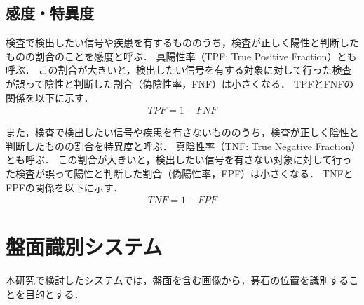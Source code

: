 \documentclass[openright]{nitocs}
\numberwithin{equation}{section}
\begin{document}
        \subsection{感度・特異度} %
        検査で検出したい信号や疾患を有するもののうち，検査が正しく陽性と判断したものの割合のことを感度と呼ぶ．
        真陽性率（TPF: True Positive Fraction）とも呼ぶ．
        この割合が大きいと，検出したい信号を有する対象に対して行った検査が誤って陰性と判断した割合（偽陰性率，FNF）は小さくなる．
        TPFとFNFの関係を以下に示す．
        \begin{align}
            TPF = 1-FNF
        \end{align}

        また，検査で検出したい信号や疾患を有さないもののうち，検査が正しく陰性と判断したものの割合を特異度と呼ぶ．
        真陰性率（TNF: True Negative Fraction）とも呼ぶ．
        この割合が大きいと，検出したい信号を有さない対象に対して行った検査が誤って陽性と判断した割合（偽陽性率，FPF）は小さくなる．
        TNFとFPFの関係を以下に示す．
        \begin{align}
            TNF = 1-FPF
        \end{align}


    \section{盤面識別システム} %
    \label{system}
        本研究で検討したシステムでは，盤面を含む画像から，碁石の位置を識別することを目的とする．
\end{document}
